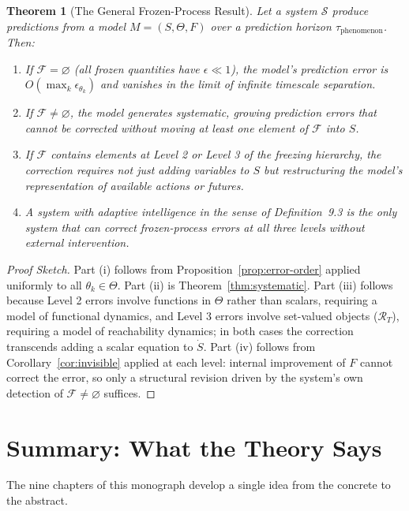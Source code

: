\documentclass[11pt]{book}
\theoremstyle{plain}
\newtheorem{theorem}{Theorem}[chapter]
\theoremstyle{definition}
\theoremstyle{remark}
\begin{document}
\begin{theorem}[The General Frozen-Process Result]
\label{thm:master}
Let a system $\mathcal{S}$ produce predictions from a model $M = (S, \Theta, F)$ over a prediction horizon $\tau_{\mathrm{phenomenon}}$. Then:
\begin{enumerate}[label=(\roman*),itemsep=3pt]
\item If $\mathcal{F} = \varnothing$ (all frozen quantities have $\epsilon \ll 1$), the model's prediction error is $O(\max_k \epsilon_{\theta_k})$ and vanishes in the limit of infinite timescale separation.
\item If $\mathcal{F} \ne \varnothing$, the model generates systematic, growing prediction errors that cannot be corrected without moving at least one element of $\mathcal{F}$ into $S$.
\item If $\mathcal{F}$ contains elements at Level 2 or Level 3 of the freezing hierarchy, the correction requires not just adding variables to $S$ but restructuring the model's representation of available actions or futures.
\item A system with adaptive intelligence in the sense of Definition~9.3 is the only system that can correct frozen-process errors at all three levels without external intervention.
\end{enumerate}
\end{theorem}
\begin{proof}[Proof Sketch]
Part (i) follows from Proposition~\ref{prop:error-order} applied uniformly to all $\theta_k \in \Theta$. Part (ii) is Theorem~\ref{thm:systematic}. Part (iii) follows because Level 2 errors involve functions in $\Theta$ rather than scalars, requiring a model of functional dynamics, and Level 3 errors involve set-valued objects ($\mathcal{R}_T$), requiring a model of reachability dynamics; in both cases the correction transcends adding a scalar equation to $\dot S$. Part (iv) follows from Corollary~\ref{cor:invisible} applied at each level: internal improvement of $F$ cannot correct the error, so only a structural revision driven by the system's own detection of $\mathcal{F} \ne \varnothing$ suffices.
\end{proof}

\section{Summary: What the Theory Says}

The nine chapters of this monograph develop a single idea from the concrete to the abstract.
\end{document}
